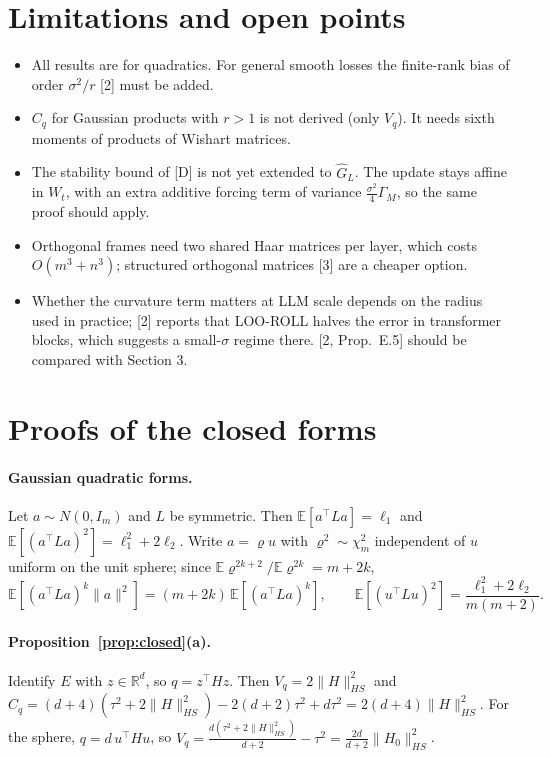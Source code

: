 \documentclass[11pt]{article}
\theoremstyle{remark}
\newcommand{\R}{\mathbb{R}}
\newcommand{\E}{\mathbb{E}}
\newcommand{\Gh}{\widehat G}
\begin{document}
\section{Limitations and open points}
\begin{itemize}
\item All results are for quadratics. For general smooth losses the finite-rank bias of order $\sigma^2/r$ [2] must be added.
\item $C_q$ for Gaussian products with $r>1$ is not derived (only $V_q$). It needs sixth moments of products of Wishart matrices.
\item The stability bound of [D] is not yet extended to $\Gh_L$. The update stays affine in $W_t$, with an extra additive forcing term of variance $\frac{\sigma^2}4\Gamma_M$, so the same proof should apply.
\item Orthogonal frames need two shared Haar matrices per layer, which costs $O(m^3+n^3)$; structured orthogonal matrices [3] are a cheaper option.
\item Whether the curvature term matters at LLM scale depends on the radius used in practice; [2] reports that LOO-ROLL halves the error in transformer blocks, which suggests a small-$\sigma$ regime there. [2, Prop.~E.5] should be compared with Section 3.
\end{itemize}

\appendix
\section{Proofs of the closed forms}\label{app:closed}
\paragraph{Gaussian quadratic forms.} Let $a\sim N(0,I_m)$ and $L$ be symmetric. Then $\E[a^\top La]=\ell_1$ and $\E[(a^\top La)^2]=\ell_1^2+2\ell_2$. Write $a=\varrho u$ with $\varrho^2\sim\chi^2_m$ independent of $u$ uniform on the unit sphere; since $\E\varrho^{2k+2}/\E\varrho^{2k}=m+2k$,
\[
\E[(a^\top La)^k\|a\|^2]=(m+2k)\,\E[(a^\top La)^k],\qquad \E[(u^\top Lu)^2]=\frac{\ell_1^2+2\ell_2}{m(m+2)} .
\]
\paragraph{Proposition~\ref{prop:closed}(a).} Identify $E$ with $z\in\R^d$, so $q=z^\top Hz$. Then $V_q=2\|H\|_{HS}^2$ and
$C_q=(d+4)(\tau^2+2\|H\|_{HS}^2)-2(d+2)\tau^2+d\tau^2=2(d+4)\|H\|_{HS}^2$. For the sphere, $q=d\,u^\top Hu$, so $V_q=\frac{d(\tau^2+2\|H\|^2_{HS})}{d+2}-\tau^2=\frac{2d}{d+2}\|H_0\|^2_{HS}$.
\end{document}
